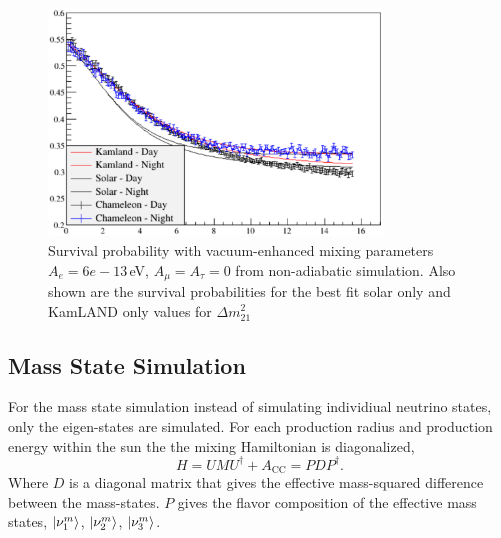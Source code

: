 \begin{figure}[htbp]
    \centering
    \includegraphics[width=0.79\textwidth]{non_adiabatic_example}
    \caption[Example Non-adiabatic Vacuum-Enhanced Neutrino Survival Probability]{
        Survival probability with vacuum-enhanced mixing parameters
        $A_{e}=6e-13$\,eV, $A_{\mu}=A_{\tau}=0$
    from non-adiabatic simulation. Also shown are the survival probabilities
    for the best fit solar only and KamLAND only values for $\Delta m^{2}_{21}$}
    \label{fig:nonadiabatic_example}
\end{figure}

\subsection{Mass State Simulation} %
For the mass state simulation instead of simulating individiual neutrino
states, only the eigen-states are simulated.
For each production radius and production energy within the sun the
the mixing Hamiltonian is diagonalized,
\begin{equation}
    H = U M U^{\dagger} + A_{\mathrm{CC}} = P D P^{\dagger}\text{.}
\end{equation}
Where $D$ is a diagonal matrix that gives the effective mass-squared
difference between the mass-states.
$P$ gives the flavor composition of the effective mass states,
$\ket{\nu^{m}_{1}}$, $\ket{\nu^{m}_{2}}$, $\ket{\nu^{m}_{3}}$.

